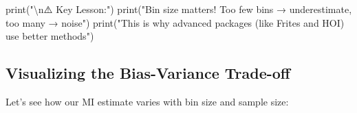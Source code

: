 \documentclass[
  11pt,
  letterpaper,
  oneside,
  openany]{book}
\newenvironment{Shaded}{\begin{snugshade}}{\end{snugshade}}
\newcommand{\BuiltInTok}[1]{\textcolor[rgb]{0.00,0.23,0.31}{#1}}
\newcommand{\CharTok}[1]{\textcolor[rgb]{0.13,0.47,0.30}{#1}}
\newcommand{\NormalTok}[1]{\textcolor[rgb]{0.00,0.23,0.31}{#1}}
\newcommand{\StringTok}[1]{\textcolor[rgb]{0.13,0.47,0.30}{#1}}
\begin{document}
\begin{Shaded}
\begin{Highlighting}[]
\BuiltInTok{print}\NormalTok{(}\StringTok{"}\CharTok{\textbackslash{}n}\StringTok{⚠️  Key Lesson:"}\NormalTok{)}
\BuiltInTok{print}\NormalTok{(}\StringTok{"Bin size matters! Too few bins → underestimate, too many → noise"}\NormalTok{)}
\BuiltInTok{print}\NormalTok{(}\StringTok{"This is why advanced packages (like Frites and HOI) use better methods"}\NormalTok{)}
\end{Highlighting}
\end{Shaded}

\subsection{Visualizing the Bias-Variance
Trade-off}\label{visualizing-the-bias-variance-trade-off}

Let's see how our MI estimate varies with bin size and sample size:
\end{document}
